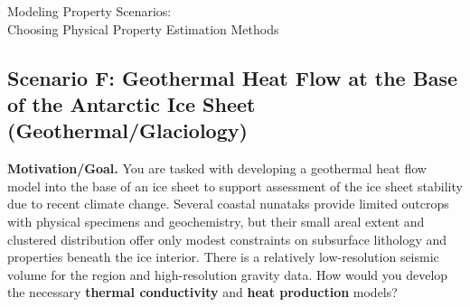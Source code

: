 \begin{activity}{Modeling Property Scenarios:\\Choosing Physical Property Estimation Methods}
\subsection*{Scenario F: Geothermal Heat Flow at the Base of the Antarctic Ice Sheet (Geothermal/Glaciology)}
\noindent\textbf{Motivation/Goal.} You are tasked with developing a geothermal heat flow model into the base of an ice sheet to support assessment of the ice sheet stability due to recent climate change. Several coastal nunataks provide limited outcrops with physical specimens and geochemistry, but their small areal extent and clustered distribution offer only modest constraints on subsurface lithology and properties beneath the ice interior.  There is a relatively low-resolution seismic volume for the region and high-resolution gravity data.  How would you develop the necessary \textbf{thermal conductivity} and \textbf{heat production} models?

\yourplan{}

\end{activity}

